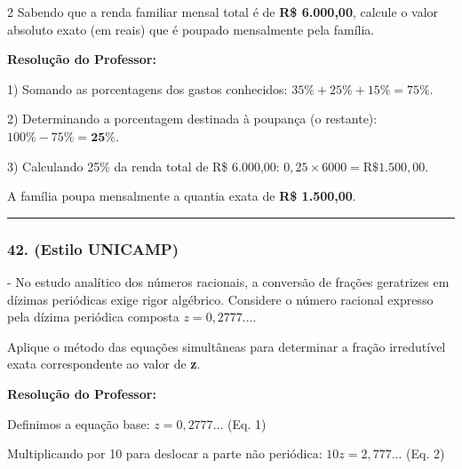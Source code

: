 \begin{multicols*}{2}
Sabendo que a renda familiar mensal total é de \textbf{R\$ 6.000,00}, calcule o valor absoluto exato (em reais) que é poupado mensalmente pela família.

\ifgabarito
    \begin{tcolorbox}[colback=CorTitUm!5, colframe=CorTitUm, boxrule=1pt, arc=4pt, left=6pt, right=6pt, top=6pt, bottom=6pt]
    \small\textbf{\textcolor{CorTitUm}{Resolução do Professor:}}\par\vspace{0.1cm}
    \color{CinzaEscuro}
    1) Somando as porcentagens dos gastos conhecidos:
    $35\% + 25\% + 15\% = 75\%$.
    
    2) Determinando a porcentagem destinada à poupança (o restante):
    $100\% - 75\% = \textbf{25\%}$.
    
    3) Calculando 25\% da renda total de R\$ 6.000,00:
    $0,25 \times 6000 = \text{R\$ } 1.500,00$.
    
    A família poupa mensalmente a quantia exata de \textbf{R\$ 1.500,00}.
    \end{tcolorbox}
\fi

\par\vspace{\espacoQuestao}

\noindent\textcolor{CorLinha}{\rule{\linewidth}{0.5pt}} 
\par\vspace{\espacoPreQuestao}
\subsubsection*{42. (Estilo UNICAMP)} - No estudo analítico dos números racionais, a conversão de frações geratrizes em dízimas periódicas exige rigor algébrico. Considere o número racional expresso pela dízima periódica composta $ z = 0,2777... $.

Aplique o método das equações simultâneas para determinar a fração irredutível exata correspondente ao valor de \textbf{z}.

\ifgabarito
    \begin{tcolorbox}[colback=CorTitUm!5, colframe=CorTitUm, boxrule=1pt, arc=4pt, left=6pt, right=6pt, top=6pt, bottom=6pt]
    \small\textbf{\textcolor{CorTitUm}{Resolução do Professor:}}\par\vspace{0.1cm}
    \color{CinzaEscuro}
    Definimos a equação base:
    $z = 0,2777...$ (Eq. 1)
    
    Multiplicando por 10 para deslocar a parte não periódica:
    $10z = 2,777...$ (Eq. 2)
    

\end{tcolorbox}
\end{multicols*}
